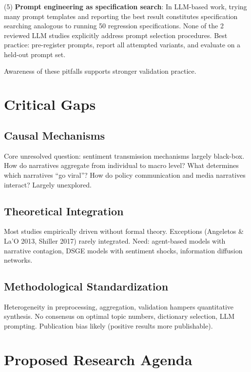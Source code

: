 \documentclass[11pt]{article}
\begin{document}
\noindent
(5) \textbf{Prompt engineering as specification search}: In LLM-based work, trying many prompt templates and reporting the best result constitutes specification searching analogous to running 50 regression specifications. None of the 2 reviewed LLM studies explicitly address prompt selection procedures. Best practice: pre-register prompts, report all attempted variants, and evaluate on a held-out prompt set.

Awareness of these pitfalls supports stronger validation practice.

\section{Critical Gaps}

\subsection{Causal Mechanisms}

Core unresolved question: sentiment transmission mechanisms largely black-box. How do narratives aggregate from individual to macro level? What determines which narratives ``go viral''? How do policy communication and media narratives interact? Largely unexplored.

\subsection{Theoretical Integration}

Most studies empirically driven without formal theory. Exceptions (Angeletos \& La'O 2013, Shiller 2017) rarely integrated. Need: agent-based models with narrative contagion, DSGE models with sentiment shocks, information diffusion networks.

\subsection{Methodological Standardization}

Heterogeneity in preprocessing, aggregation, validation hampers quantitative synthesis. No consensus on optimal topic numbers, dictionary selection, LLM prompting. Publication bias likely (positive results more publishable).

\section{Proposed Research Agenda}
\end{document}
